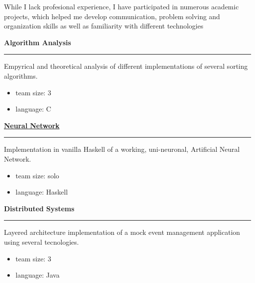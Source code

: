 \documentclass [10pt, a4paper] {extarticle}
\newcommand{\rightcolumwidth}{ 0.82 }
\begin{document}
    \begin {flushright}
    \begin {minipage} [t] {\rightcolumwidth\textwidth}
        While I lack profesional experience, I have participated in numerous academic projects, which helped me develop communication, problem solving and organization skills as well as familiarity with different technologies \\ [7px]
        \begin {minipage} [t] {0.3\textwidth}
            \textbf {Algorithm Analysis} \\ [-5px]
            \hrule
            \vspace {4px} Empyrical and theoretical analysis of different implementations of several sorting algorithms.
            \vspace {-5px}
            \begin {itemize} [noitemsep]
            \item team size: 3
            \item language: C
            \end {itemize}
        \end {minipage}
        \hfill
        \begin {minipage} [t] {0.3\textwidth}
            \href {https://github.com/yref-boop/ann} {\textbf {Neural Network}} \\ [-5px]
            \hrule
            \vspace {4px} Implementation in vanilla Haskell of a working, uni-neuronal, Artificial Neural Network.
            \vspace {-5px}
            \begin {itemize} [noitemsep]
                \item team size: solo
                \item language: Haskell
            \end {itemize}
        \end {minipage}
        \hfill
        \begin {minipage} [t] {0.3\textwidth}
            \textbf {Distributed Systems} \\ [-5px]
            \hrule
            \vspace {4px} Layered architecture implementation of a mock event management application using several tecnologies.
            \vspace {-5px}
            \begin {itemize} [noitemsep]
                \item team size: 3
                \item language: Java
            \end {itemize}
        \end {minipage}
    \end {minipage}
    \end {flushright}
\end{document}
